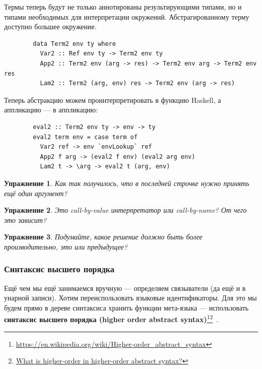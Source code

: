 \documentclass[12pt]{article}
\newcommand{\vocab}[1]{\textbf{#1}} %
\newtheorem{task}{Упражнение}
\begin{document}
    Термы теперь будут не только аннотированы результирующими типами, но и типами необходимых для интерпретации окружений.
    Абстрагированному терму доступно большее окружение.

    \begin{verbatim}
        data Term2 env ty where
          Var2 :: Ref env ty -> Term2 env ty
          App2 :: Term2 env (arg -> res) -> Term2 env arg -> Term2 env res
          Lam2 :: Term2 (arg, env) res -> Term2 env (arg -> res)
    \end{verbatim}

    Теперь абстракцию можем проинтерпретировать в функцию Haskell, а аппликацию --- в аппликацию:
    \begin{verbatim}
        eval2 :: Term2 env ty -> env -> ty
        eval2 term env = case term of
          Var2 ref -> env `envLookup` ref
          App2 f arg -> (eval2 f env) (eval2 arg env)
          Lam2 t -> \arg -> eval2 t (arg, env)
    \end{verbatim}

    \begin{task}
        Как так получилось, что в последней строчке нужно принять ещё один аргумент?
    \end{task}

    \begin{task}
        Это call-by-value интерпретатор или call-by-name?
        От чего это зависит?
    \end{task}

    \begin{task}
        Подумайте, какое решение должно быть более производительно, это или предыдущее?
    \end{task}

    \subsubsection{Синтаксис высшего порядка}

    Ещё чем мы ещё занимаемся вручную --- определяем связыватели (да ещё и в унарной записи).
    Хотим переиспользовать языковые идентификаторы.
    Для это мы будем прямо в дереве синтаксиса хранить функции мета-языка --- использовать \vocab{синтаксис высшего порядка (higher order abstract syntax)}\footnote{\url{https://en.wikipedia.org/wiki/Higher-order_abstract_syntax}}\footnote{\href{https://cstheory.stackexchange.com/questions/20071/what-is-higher-order-in-higher-order-abstract-syntax}{What is higher-order in higher-order abstract syntax?}}~\cite{pfenning1988higher}.
\end{document}
